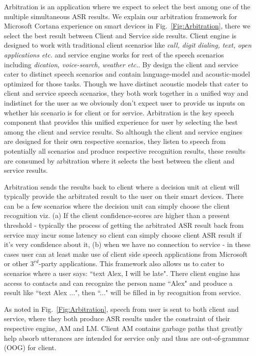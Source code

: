 Arbitration is an application where we expect to select the best among one of the multiple simultaneous ASR results.
We explain our arbitration framework for Microsoft Cortana experience on smart devices in Fig.~\ref{Fig:Arbitration}, there we select the best result between Client and Service side results. Client engine is designed to work with traditional client scenarios like \emph{call, digit dialing, text, open applications etc.} and service engine works for rest of the speech scenarios including \emph{dication, voice-search, weather etc.}. By design the client and service cater to distinct speech scenarios and contain language-model and acoustic-model optimized for those tasks. Though we have distinct acoustic models that cater to client and service speech scenarios, they both work together in a unified way and indistinct for the user as we obviously don't expect user
to provide us inputs on whether his scenario is for client or for service. Arbitration is the key speech component that provides this unified experience for user by selecting the best among the client and service results.  So although the client and service engines are designed for their own respective scenarios, they listen to speech from potentially all scenarios and produce respective recognition results, these results are consumed by arbitration where it selects the best between the client and service results. 

Arbitration sends the results back to client where a decision unit at client will typically provide the arbitrated result to the user on their smart devices. There can be a few scenarios where the decision unit can simply choose the client recognition viz. (a)  
If the client confidence-scores are higher than a present threshold - typically the process of getting the arbitrated ASR result back from service may incur some latency so client can simply choose client ASR result if it's very confidence about it, (b) when we have no connection to service - in these cases user can at least make use of client side speech applications from Microsoft or other $3^{rd}$-party applications. This framework also allows us to cater to scenarios where a user says: ``text Alex, I will be late". There client engine has access to contacts and can recognize the person name ``Alex" and produce a result like ``text Alex ...", then ``..." will be filled in by recognition from service.

As noted in Fig.~\ref{Fig:Arbitration}, speech from user is sent to both client and service, where they both produce ASR results under the constraint of their respective engine, AM and LM. Client AM contains garbage paths that greatly help absorb utterances are intended for service only and thus are out-of-grammar (OOG) for client.


